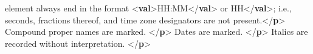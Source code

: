 \begin{shaded}
\hspace*{1em}\hspace*{1em}\hspace*{1em}\hspace*{1em}\hspace*{1em}\hspace*{1em}\hspace*{1em}\hspace*{1em} element always end in the format {<\textbf{val}>}HH:MM{</\textbf{val}>} or\mbox{}\newline 
\hspace*{1em}\hspace*{1em}\hspace*{1em}HH{</\textbf{val}>}; i.e., seconds, fractions thereof, and time\mbox{}\newline 
\hspace*{1em}\hspace*{1em}\hspace*{1em}\hspace*{1em}\hspace*{1em}\hspace*{1em}\hspace*{1em}\hspace*{1em} zone designators are not present.{</\textbf{p}>}\mbox{}\newline 
\hspace*{1em}\hspace*{1em}\mbox{}\newline 
\hspace*{1em}\hspace*{1em}\mbox{}\newline 
\hspace*{1em}\hspace*{1em}\hspace*{1em}Compound proper names are marked. {</\textbf{p}>}\mbox{}\newline 
\hspace*{1em}\hspace*{1em}\hspace*{1em}Dates are marked. {</\textbf{p}>}\mbox{}\newline 
\hspace*{1em}\hspace*{1em}\hspace*{1em}Italics are recorded without interpretation. {</\textbf{p}>}\mbox{}\newline 

\end{shaded}
